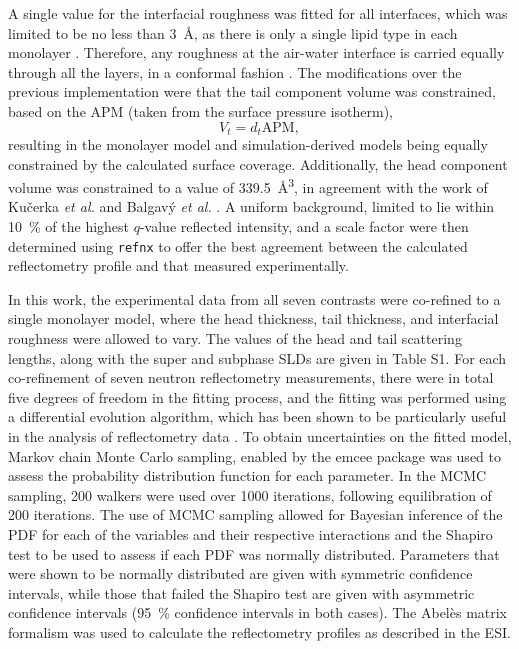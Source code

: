 \documentclass[amsmath,amssymb,twocolumn,superscriptaddress]{revtex4-1}
\begin{document}
%
A single value for the interfacial roughness was fitted for all interfaces, which was limited to be no less than \SI{3}{\angstrom}, as there is only a single lipid type in each monolayer \cite{campbell_structure_2018}.
Therefore, any roughness at the air-water interface is carried equally through all the layers, in a conformal fashion \cite{kozhevnikov_general_2012}.
The modifications over the previous implementation were that the tail component volume was constrained, based on the APM (taken from the surface pressure isotherm),
%
\begin{equation}
  V_t = d_t \text{APM},
\end{equation}
%
resulting in the monolayer model and simulation-derived models being equally constrained by the calculated surface coverage.
Additionally, the head component volume was constrained to a value of \SI{339.5}{\angstrom\cubed}, in agreement with the work of Ku\v{c}erka \emph{et al.}\cite{kucerka_determination_2004} and Balgav\'{y} \emph{et al.} \cite{balgavy_evaluation_2001}.
A uniform background, limited to lie within \SI{10}{\percent} of the highest $q$-value reflected intensity, and a scale factor were then determined using \texttt{refnx} to offer the best agreement between the calculated reflectometry profile and that measured experimentally.

In this work, the experimental data from all seven contrasts were co-refined to a single monolayer model, where the head thickness, tail thickness, and interfacial roughness were allowed to vary.
The values of the head and tail scattering lengths, along with the super and subphase SLDs are given in Table S1.
For each co-refinement of seven neutron reflectometry measurements, there were in total five degrees of freedom in the fitting process, and the fitting was performed using a differential evolution algorithm, which has been shown to be particularly useful in the analysis of reflectometry data \cite{wormington_characterization_1999,bjorck_fitting_2011}.
To obtain uncertainties on the fitted model, Markov chain Monte Carlo sampling, enabled by the emcee package \cite{foreman-mackey_emcee_2013} was used to assess the probability distribution function for each parameter.
In the MCMC sampling, 200 walkers were used over 1000 iterations, following equilibration of 200 iterations.
The use of MCMC sampling allowed for Bayesian inference of the PDF for each of the variables and their respective interactions and the Shapiro test to be used to assess if each PDF was normally distributed.
Parameters that were shown to be normally distributed are given with symmetric confidence intervals, while those that failed the Shapiro test are given with asymmetric confidence intervals (\SI{95}{\percent} confidence intervals in both cases).
The Abel\`{e}s matrix formalism was used to calculate the reflectometry profiles as described in the ESI.
\end{document}
